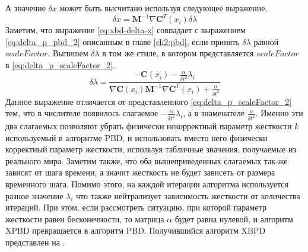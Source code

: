 	А значение $\delta x$ может быть высчитано используя следующее выражение.
\begin{equation} \label{eq:xbd-delta-x}
	 \delta x = \textbf{M}^{-1} \nabla \textbf{C}^T(x_i) \delta \lambda
\end{equation}	
	Заметим, что выражение \ref{eq:xbd-delta-x} совпадает с выражением \ref{eq:delta_p_pbd_2} описанным в главе \ref{ch2:pbd}, если принять $\delta \lambda$ равной $scaleFactor$. Выпишем $\delta \lambda$ в том же стиле, в котором представляется $scaleFactor$ в \ref{eq:delta_p_scaleFactor_2}.
\begin{equation} \label{eq:xbd-delta-lambda}
	\delta \lambda = \frac{-\textbf{C}(x_i) - \frac{\alpha}{\delta t^2}\lambda_i}{\nabla \textbf{C}(x_i) \textbf{M}^{-1} \nabla \textbf{C}^T(x_i) + \frac{\alpha}{\delta t^2}}
\end{equation}	
	Данное выражение отличается от представленного  \ref{eq:delta_p_scaleFactor_2} тем, что в числителе появилось слагаемое $- \frac{\alpha}{\delta t^2}\lambda_i$, а в знаменателе $\frac{\alpha}{\delta t^2}$. Именно эти два слагаемых позволяют убрать физически некорректный параметр жесткости $k$ используемый в алгоритме PBD, и использовать вместо него физически корректный параметр жесткости, используя табличные значения, получаемые из реального мира. Заметим также, что оба вышеприведенных слагаемых так-же зависят от шага времени, а значит жесткость не будет зависеть от размера временного шага. Помимо этого, на каждой итерации алгоритма используется разное значение $\lambda_i$ что также нейтрализует зависимость жесткости от количества итераций. При этом, если рассмотреть ситуацию, при которой параметр жесткости равен бесконечности, то матрица $\alpha$ будет равна нулевой, и алгоритм XPBD превращается в алгоритм PBD.
	Получившийся алгоритм XBPD представлен на .
	
